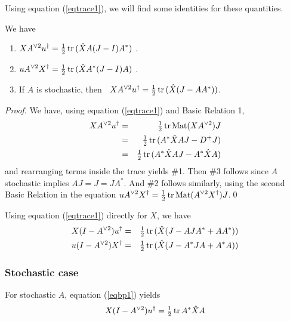 Using equation (\ref{eqtrace1}), we will find some identities for these quantities.

\begin{proposition}\label{propTR}  \label{prop:7.3}
We have 
\begin{enumerate}
\item[{\normalfont 1.}] $\displaystyle X\spow{A}{2}\dg  u. = \half \,\tr (\hat X A(J-I)A^*)$ .

\item[{\normalfont 2.}] $\displaystyle u\spow{A}{2}\dg  X. = \half \,\tr (\hat X A^*(J-I)A)$ .

\item[{\normalfont 3.}] If $A$ is stochastic, then \ $X\spow{A}{2}\dg  u. = \half \,\tr (\hat X (J-AA^*))$.
\end{enumerate}
\end{proposition}

\begin{proof} We have, using equation (\ref{eqtrace1}) and Basic Relation 1,
%
\begin{eqnarray*}
  X\spow{A}{2}\dg  u.  
 &=& \half \,\tr \Mat(X\spow{A}{2})J\\
 &=& \half\,\tr (\symm{A}{\hat X}J-D^+J) \\
 &=& \half\,\tr (\symm{A}{\hat X}J-\symm{A}{\hat X})
 \end{eqnarray*}
%
and rearranging terms inside the trace yields \#1. 
Then \#3 follows since $A$ stochastic implies $AJ=J=JA^*$.
And \#2 follows similarly, using the second Basic Relation in the equation
$\displaystyle u\spow{A}{2}\dg  X. = \half \,\tr \Mat(\spow{A}{2}\dg  X.)J$.\qed
\end{proof}

Using  equation (\ref{eqtrace1}) directly for $X$, we have 
%
\begin{eqnarray}
X(I-\spow{A}{2})\dg  u.  &=&  \half \,\tr (\hat X (J-AJA^*+AA^*)) \label{eqbp1}\\
u(I-\spow{A}{2})\dg  X.  &=&  \half \,\tr (\hat X (J-A^*JA+A^*A))\label{eqbp2}
\end{eqnarray}
%


\subsubsection{Stochastic case}
\label{sec:7.1.3.1}

For stochastic $A$, equation (\ref{eqbp1}) yields
\begin{equation}\label{eqparts}
X(I-\spow{A}{2})\dg  u. = \half \,\tr A^*\hat XA
\end{equation}

